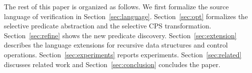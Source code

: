 
The rest of this paper is organized as follows.
We first formalize the source language of verification in
Section~\ref{sec:language}.  Section~\ref{sec:opt} formalizes the
selective predicate abstraction and the selective CPS transformation.
Section~\ref{sec:refine} shows the new predicate discovery.
Section~\ref{sec:extension} describes the language extensions for recursive
data structures and control operations.  Section~\ref{sec:experiments}
reports experiments.  Section~\ref{sec:related} discusses related work
and Section~\ref{sec:conclusion} concludes the paper.














